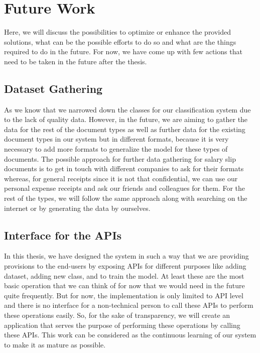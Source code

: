 \section{Future Work}
Here, we will discuss the possibilities to optimize or enhance the provided solutions, what can be the possible efforts to do so and what are the things required to do in the future. For now, we have come up with few actions that need to be taken in the future after the thesis.
\subsection{Dataset Gathering}
As we know that we narrowed down the classes for our classification system due to the lack of quality data. However, in the future, we are aiming to gather the data for the rest of the document types as well as further data for the existing document types in our system but in different formats, because it is very necessary to add more formats to generalize the model for these types of documents. The possible approach for further data gathering for salary slip documents is to get in touch with different companies to ask for their formats whereas, for general receipts since it is not that confidential, we can use our personal expense receipts and ask our friends and colleagues for them. For the rest of the types, we will follow the same approach along with searching on the internet or by generating the data by ourselves.
\subsection{Interface for the APIs}
In this thesis, we have designed the system in such a way that we are providing provisions to the end-users by exposing APIs for different purposes like adding dataset, adding new class, and to train the model. At least these are the most basic operation that we can think of for now that we would need in the future quite frequently. But for now, the implementation is only limited to API level and there is no interface for a non-technical person to call these APIs to perform these operations easily. So, for the sake of transparency, we will create an application that serves the purpose of performing these operations by calling these APIs. This work can be considered as the continuous learning of our system to make it as mature as possible.
